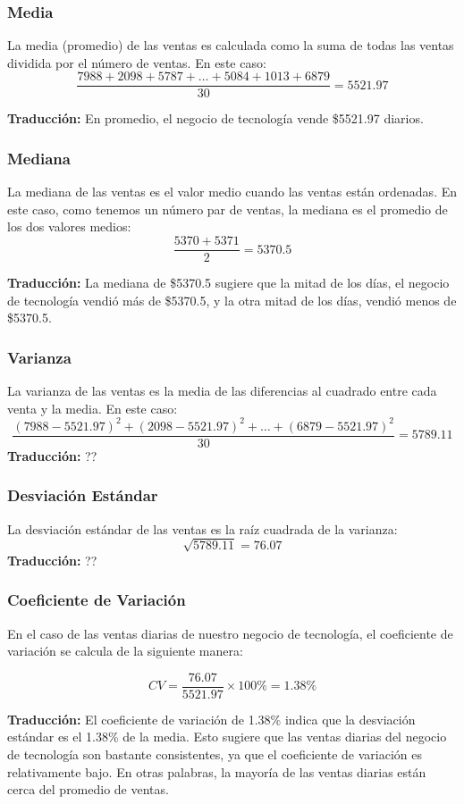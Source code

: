 \documentclass[aspectratio=169]{beamer}
\begin{document}
\begin{frame}
\frametitle{Media}
La media (promedio) de las ventas es calculada como la suma de todas las ventas dividida por el número de ventas. En este caso:
\[
\frac{7988 + 2098 + 5787 + \ldots + 5084 + 1013 + 6879}{30} = 5521.97
\]

\vfill \textbf{Traducción:} En promedio, el negocio de tecnología vende \$5521.97 diarios.
\end{frame}

\begin{frame}
\frametitle{Mediana}
La mediana de las ventas es el valor medio cuando las ventas están ordenadas. En este caso, como tenemos un número par de ventas, la mediana es el promedio de los dos valores medios:
\[
\frac{5370 + 5371}{2} = 5370.5
\]

\vfill \textbf{Traducción:} La mediana de \$5370.5 sugiere que la mitad de los días, el negocio de tecnología vendió más de \$5370.5, y la otra mitad de los días, vendió menos de \$5370.5.
\end{frame}

\begin{frame}
\frametitle{Varianza}
La varianza de las ventas es la media de las diferencias al cuadrado entre cada venta y la media. En este caso:
{\small \[
\frac{(7988 - 5521.97)^2 + (2098 - 5521.97)^2 + \ldots  + (6879 - 5521.97)^2}{30} = 5789.11
\]
}
\vfill \textbf{Traducción:} ??
\end{frame}

\begin{frame}
\frametitle{Desviación Estándar}
La desviación estándar de las ventas es la raíz cuadrada de la varianza:
\[
\sqrt{5789.11} = 76.07
\]
\vfill \textbf{Traducción:} ??
\end{frame}

\begin{frame}
\frametitle{Coeficiente de Variación}

En el caso de las ventas diarias de nuestro negocio de tecnología, el coeficiente de variación se calcula de la siguiente manera:

\[
CV = \frac{76.07}{5521.97} \times 100\% = 1.38\%
\]

\vfill

\textbf{Traducción:} El coeficiente de variación de 1.38\% indica que la desviación estándar es el 1.38\% de la media. Esto sugiere que las ventas diarias del negocio de tecnología son bastante consistentes, ya que el coeficiente de variación es relativamente bajo. En otras palabras, la mayoría de las ventas diarias están cerca del promedio de ventas.
\end{frame}
\end{document}
